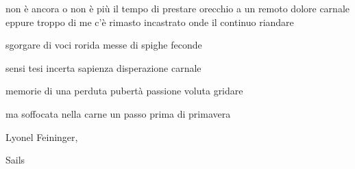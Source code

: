 \clearpage


\begin{poem}
	\begin{stanza}
		non è ancora\verseline
		o non è più il tempo\verseline
		di prestare orecchio\verseline
		a un remoto dolore carnale\verseline
		eppure\verseline
		troppo di me c'è rimasto incastrato\verseline
		onde il continuo riandare
	\end{stanza}
\end{poem}

\clearpage


\begin{poem}
	\begin{stanza}
		sgorgare di voci\verseline
		rorida messe\verseline
		di spighe feconde
	\end{stanza}

	\begin{stanza}
		sensi tesi\verseline
		incerta sapienza\verseline
		disperazione carnale
	\end{stanza}

	\begin{stanza}
		memorie di una\verseline
		perduta pubertà\verseline
		passione voluta gridare
	\end{stanza}

	\begin{stanza}
		ma soffocata nella carne\verseline
		un passo prima di primavera
	\end{stanza}
\end{poem}

\clearpage


\begin{artItem}
	Lyonel Feininger, \begin{otherlanguage}{english}%
		Sails%
	\end{otherlanguage}
\end{artItem}

